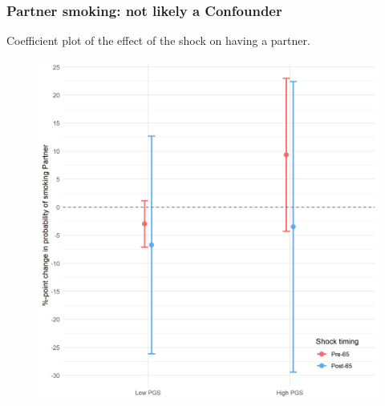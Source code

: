 \documentclass[10pt,compress,xcolor=dvipsnames,aspectratio=169]{beamer}    %
\newcounter{ex}
\newcommand{\1}[1]{\mathrm{1\hspace*{-2.5pt}l}[#1]}	%
\begin{document}
\begin{frame}
\frametitle{Partner smoking: not likely a Confounder}
Coefficient plot of the effect of the shock on having a partner.
\begin{figure}[hbtp]

\centering
\includegraphics[height=0.8\textheight]{../../3_output/shock_effects/smokePartner_6070_100_cv.png}
\label{fig:smokePartner}
\end{figure}
\end{frame}
\end{document}
